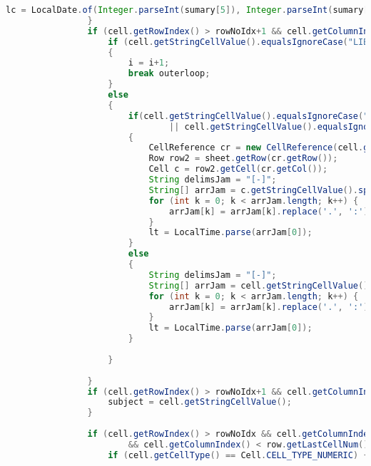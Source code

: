 \begin{lstlisting}[language=Java,basicstyle=\tiny,caption=ExcelConverter.java,label=lst:ExcelConverter]
                    lc = LocalDate.of(Integer.parseInt(sumary[5]), Integer.parseInt(sumary[3]), Integer.parseInt(sumary[2]));
                }
                if (cell.getRowIndex() > rowNoIdx+1 && cell.getColumnIndex() == (colNoIdx + 2)) {
                    if (cell.getStringCellValue().equalsIgnoreCase("LIBUR"))
                    {   
                        i = i+1;
                        break outerloop;
                    }
                    else
                    {
                        if(cell.getStringCellValue().equalsIgnoreCase("Shift 1") 
                                || cell.getStringCellValue().equalsIgnoreCase("Shift 2"))
                        {
                            CellReference cr = new CellReference(cell.getRowIndex()+1, cell.getColumnIndex());
                            Row row2 = sheet.getRow(cr.getRow());
                            Cell c = row2.getCell(cr.getCol());
                            String delimsJam = "[-]";
                            String[] arrJam = c.getStringCellValue().split(delimsJam);
                            for (int k = 0; k < arrJam.length; k++) {
                                arrJam[k] = arrJam[k].replace('.', ':');
                            }
                            lt = LocalTime.parse(arrJam[0]);                            
                        }
                        else
                        {
                            String delimsJam = "[-]";
                            String[] arrJam = cell.getStringCellValue().split(delimsJam);
                            for (int k = 0; k < arrJam.length; k++) {
                                arrJam[k] = arrJam[k].replace('.', ':');
                            }
                            lt = LocalTime.parse(arrJam[0]);
                        }
                        
                    }
                                        
                }
                if (cell.getRowIndex() > rowNoIdx+1 && cell.getColumnIndex() == colMatkulIdx ) {
                    subject = cell.getStringCellValue();
                }
   
                if (cell.getRowIndex() > rowNoIdx && cell.getColumnIndex() >= colMatkulIdx+1 
                        && cell.getColumnIndex() < row.getLastCellNum()) {
                    if (cell.getCellType() == Cell.CELL_TYPE_NUMERIC) {


\end{lstlisting}
